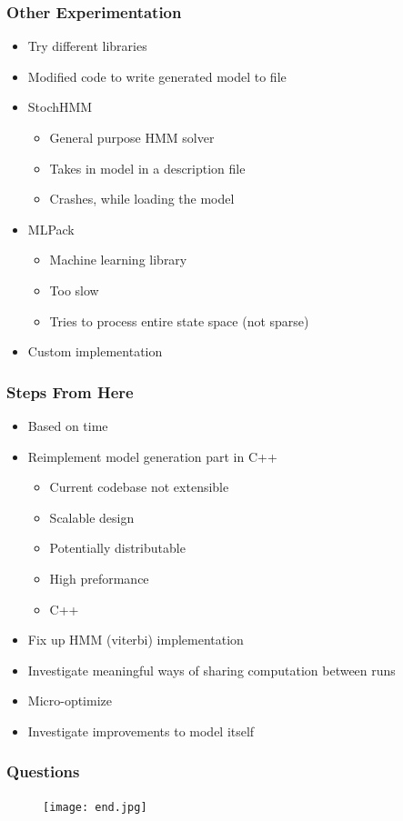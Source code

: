 \documentclass{beamer}
\begin{document}
\begin{frame}[fragile]
\frametitle{Other Experimentation}
\begin{itemize}
 \item Try different libraries
 \item Modified code to write generated model to file
 \item StochHMM
 \begin{itemize}
  \item General purpose HMM solver
  \item Takes in model in a description file
  \item Crashes, while loading the model
 \end{itemize}
 \item MLPack
 \begin{itemize}
  \item Machine learning library
  \item Too slow
  \item Tries to process entire state space (not sparse)
 \end{itemize}
 \item Custom implementation
\end{itemize}
\end{frame}


\begin{frame}
\frametitle{Steps From Here}
\begin{itemize}
 \item Based on time
 \item Reimplement model generation part in C++
 \begin{itemize}
  \item Current codebase not extensible
  \item Scalable design
  \item Potentially distributable
  \item High preformance
  \item C++
 \end{itemize}
 \item Fix up HMM (viterbi) implementation
 \item Investigate meaningful ways of sharing computation between runs
 \item Micro-optimize
 \item Investigate improvements to model itself
\end{itemize}

\end{frame}

\begin{frame}
\frametitle{Questions}
\begin{figure}
\texttt{[image: end.jpg]}
\end{figure}

\end{frame}
\end{document}
